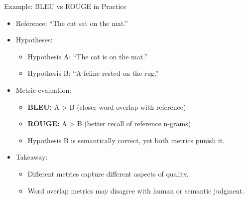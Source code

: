 \begin{frame}[allowframebreaks]{Example: BLEU vs ROUGE in Practice}

\begin{itemize}
    \item Reference: ``The cat sat on the mat.''

    \item Hypotheses:
    \begin{itemize}
        \item Hypothesis A: ``The cat is on the mat.''
        \item Hypothesis B: ``A feline rested on the rug.''
    \end{itemize}

    \item Metric evaluation:
    \begin{itemize}
        \item \textbf{BLEU:} A > B (closer word overlap with reference)
        \item \textbf{ROUGE:} A > B (better recall of reference n-grams)
        \item Hypothesis B is semantically correct, yet both metrics punish it.
    \end{itemize}

    \item Takeaway:
    \begin{itemize}
        \item Different metrics capture different aspects of quality.
        \item Word overlap metrics may disagree with human or semantic judgment.
    \end{itemize}
\end{itemize}

\end{frame}
